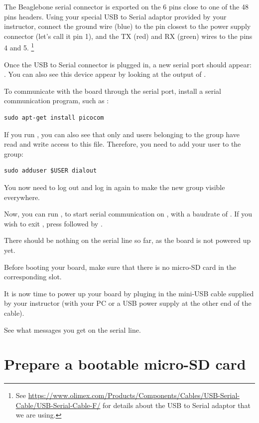 The Beaglebone serial connector is exported on the 6 pins close to one
of the 48 pins headers. Using your special USB to Serial adaptor provided
by your instructor, connect the ground wire (blue) to the pin closest
to the power supply connector (let's call it pin 1), and the TX (red)
and RX (green) wires to the pins 4 and 5.
\footnote{See
\url{https://www.olimex.com/Products/Components/Cables/USB-Serial-Cable/USB-Serial-Cable-F/}
for details about the USB to Serial adaptor that we are using.} 

Once the USB to Serial connector is plugged in, a new serial port
should appear: .  You can also see this device
appear by looking at the output of .

To communicate with the board through the serial port, install a
serial communication program, such as :

\begin{verbatim}
sudo apt-get install picocom
\end{verbatim}

If you run , you can also see that only
 and users belonging to the  group have
read and write access to this file. Therefore, you need to add your user
to the  group:

\begin{verbatim}
sudo adduser $USER dialout
\end{verbatim}

You now need to log out and log in again to make the new group
visible everywhere.

Now, you can run , to start serial
communication on , with a baudrate of . If
you wish to exit , press \code{[Ctrl][a]} followed by
\code{[Ctrl][x]}.

There should be nothing on the serial line so far, as the board is not
powered up yet.

Before booting your board, make sure that there is no micro-SD card
in the corresponding slot.

It is now time to power up your board by pluging in the mini-USB
cable supplied by your instructor (with your PC or a USB power supply at the
other end of the cable).

See what messages you get on the serial line.

\section{Prepare a bootable micro-SD card}

